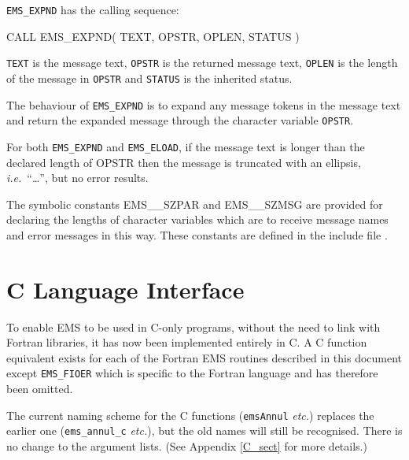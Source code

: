 \documentclass[twoside,11pt]{starlink}
\begin{document}
\texttt{EMS\_EXPND} has the calling sequence:
\begin{terminalv}
CALL EMS_EXPND( TEXT, OPSTR, OPLEN, STATUS )
\end{terminalv}
\texttt{TEXT} is the message text, \texttt{OPSTR} is the returned message text,
\texttt{OPLEN} is the length of the message in \texttt{OPSTR} and
\texttt{STATUS} is the inherited status.

The behaviour of \texttt{EMS\_EXPND} is to expand any message tokens in the
message text and return the expanded message through the character variable
\texttt{OPSTR}.

For both \texttt{EMS\_EXPND} and \texttt{EMS\_ELOAD}, if the message text is
longer than the declared length of OPSTR then the message is truncated with an
ellipsis, \textit{i.e.}\ ``\ldots'', but no error results.

The symbolic constants EMS\_\_SZPAR and EMS\_\_SZMSG are provided for declaring
the lengths of character variables which are to receive message names and
error messages in this way.
These constants are defined in the include file
.

\section{C Language Interface}
\label{C_lang}
To enable EMS to be used in C-only programs, without the need to link with
Fortran libraries, it has now been implemented entirely
in C. A C function equivalent exists for each of the Fortran EMS routines
described in this document except \texttt{EMS\_FIOER} which is specific to the
Fortran language and has therefore been omitted.

The current naming scheme for the C functions (\texttt{emsAnnul}
\textit{etc.}) replaces the earlier one (\texttt{ems\_annul\_c} \textit{etc.}),
but the old names will still be recognised.
There is no change to the argument lists.
(See Appendix \ref{C_sect} for more details.)
\end{document}

